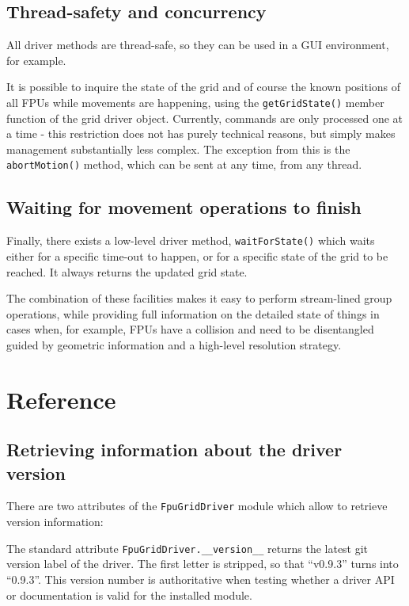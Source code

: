 \documentclass[11pt,a4paper]{scrartcl}
\begin{document}
\subsection{Thread-safety and concurrency}
All driver methods are thread-safe, so they can be used in a GUI
environment, for example.

It is possible to inquire the state of the grid and of course the
known positions of all FPUs while movements are happening, using the
\texttt{getGridState()} member function of the grid driver
object. Currently, commands are only processed one at a time - this
restriction does not has purely technical reasons, but simply makes
management substantially less complex. The exception from this is the
\texttt{abortMotion()} method, which can be sent at any time, from any
thread.

\subsection{Waiting for movement operations to finish}
Finally, there exists a low-level driver method,
\texttt{waitForState()} which waits either for a specific time-out to
happen, or for a specific state of the grid to be reached. It always
returns the updated grid state.

The combination of these facilities makes it easy to perform
stream-lined group operations, while providing full information on the
detailed state of things in cases when, for example, FPUs have a
collision and need to be disentangled guided by geometric information
and a high-level resolution strategy.



\section{Reference}
\label{sec:reference}

\subsection{Retrieving information about the driver version}
There are two attributes of the \texttt{FpuGridDriver} module
which allow to retrieve version information:

The standard attribute \texttt{FpuGridDriver.\_\_version\_\_} returns
the latest git version label of the driver. The first letter is stripped, so
that ``v0.9.3'' turns into ``0.9.3''. This version number is
authoritative when testing whether a driver API or documentation is
valid for the installed module.
\end{document}
